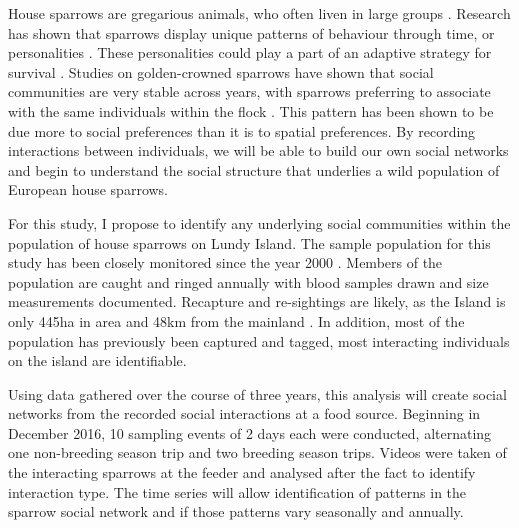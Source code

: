 \documentclass[11pt]{article}
\begin{document}
\par House sparrows are gregarious animals, who often liven in large groups \citep{Hoi2011}⁠.  Research has shown that sparrows display unique patterns of behaviour through time, or personalities \citep{Winney2017}⁠.  These personalities could play a part of an adaptive strategy for survival \citep{Dall2004}⁠.  Studies on golden-crowned sparrows have shown that social communities are very stable across years, with sparrows preferring to associate with the same individuals within the flock \citep{Arnberg2015}⁠.  This pattern has been shown to be due more to social preferences than it is to spatial preferences.   By recording interactions between individuals, we will be able to build our own social networks and begin to understand the social structure that underlies a wild population of European house sparrows.
\par For this study, I propose to identify any underlying social communities within the population of house sparrows on Lundy Island.  The sample population for this study has been closely monitored since the year 2000 \citep{Nakagawa2007}⁠.  Members of the population are caught and ringed annually with blood samples drawn and size measurements documented.  Recapture and re-sightings are likely, as the Island is only 445ha in area and 48km from the mainland \citep{DBIRDS}.   In addition, most of the population has previously been captured and tagged, most interacting individuals on the island are identifiable.
\par  Using data gathered over the course of three years, this analysis will create social networks from the recorded social interactions at a food source.  Beginning in December 2016, 10 sampling events of 2 days each were conducted, alternating one non-breeding season trip and two breeding season trips.  Videos were taken of the interacting sparrows at the feeder and analysed after the fact to identify interaction type.  The time series will allow identification of patterns in the sparrow social network and if those patterns vary seasonally and annually.\\  

\end{document}
